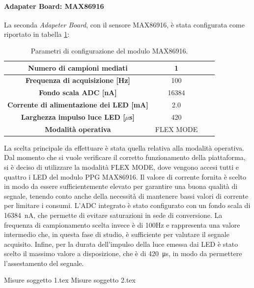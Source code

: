 \paragraph{Adapater Board: MAX86916}
La seconda \textit{Adapeter Board}, con il sensore MAX86916, è stata configurata come riportato in tabella \ref{tab:ConfigMAX86916}:
\begin{table}[b]
	\renewcommand{\arraystretch}{1.5}
	\centering
	\footnotesize
	\begin{tabular}{cccc}
		\textbf{Numero di campioni mediati} & 1 \\ \hline
		\textbf{Frequenza di acquisizione [Hz]} & 100 \\ \hline
		\textbf{Fondo scala ADC [nA]} & 16384 \\ \hline
		\textbf{Corrente di alimentazione dei LED [mA]} & 2.0 \\ \hline
		\textbf{Larghezza impulso luce LED [$\mu$s]} & 420 \\ \hline
		\textbf{Modalità operativa} & FLEX MODE \\ \hline
	\end{tabular}
	\caption{Parametri di configurazione del modulo MAX86916.}
	\label{tab:ConfigMAX86916}
\end{table}
La scelta principale da effettuare è stata quella relativa alla modalità operativa. Dal momento che si vuole verificare il corretto funzionamento della piattaforma, si è deciso di utilizzare la modalità FLEX MODE, dove vengono accesi tutti e quattro i LED del modulo PPG MAX86916. Il valore di corrente fornita è scelto in modo da essere sufficientemente elevato per garantire una buona qualità di segnale, tenendo conto anche della necessità di mantenere bassi valori di corrente per limitare i consumi. L'ADC integrato è stato configurato con un fondo scala di \SI{16384}{\nano\ampere}, che permette di evitare saturazioni in sede di conversione. La frequenza di campionamento scelta invece è di 100Hz e rappresenta una valore intermedio che, in questa fase di studio, è sufficiente per valutare il segnale acquisito. Infine, per la durata dell'impulso della luce emessa dai LED è stato scelto il massimo valore a disposizione, che è di \SI{420}{\micro\second}, in modo da permettere l'assestamento del segnale.

{Misure soggetto 1.tex}
{Misure soggetto 2.tex}